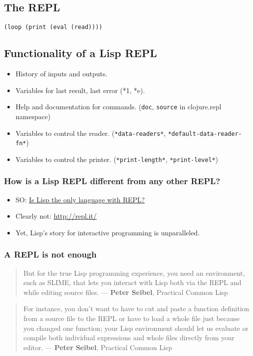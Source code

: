 \documentclass[11pt]{article}
\begin{document}
\subsection*{The REPL}
\label{sec:orgheadline12}
\begin{verbatim}
(loop (print (eval (read))))
\end{verbatim}
\subsection*{Functionality of a Lisp REPL}
\label{sec:orgheadline15}
\begin{itemize}
\item History of inputs and outputs.
\item Variables for last result, last error (*1, *e).
\item Help and documentation for commands. (\texttt{doc}, \texttt{source} in clojure.repl namespace)
\item Variables to control the reader. (\texttt{*data-readers*}, \texttt{*default-data-reader-fn*})
\item Variables to control the printer. (\texttt{*print-length*}, \texttt{*print-level*})
\end{itemize}
\subsubsection*{How is a Lisp REPL different from any other REPL?}
\label{sec:orgheadline13}

\begin{itemize}
\item SO: \href{http://stackoverflow.com/questions/5671214/is-lisp-the-only-language-with-repl}{Is Lisp the only language with REPL?}
\item Clearly not: \url{http://repl.it/}
\item Yet, Lisp’s story for interactive programming is unparalleled.
\end{itemize}

\subsubsection*{A REPL is not enough}
\label{sec:orgheadline14}
\begin{quote}
But for the true Lisp programming experience, you need an environment, such as SLIME, that lets you interact with Lisp both via the REPL and while editing source files. — \textbf{Peter Seibel}, Practical Common Lisp
\end{quote}
\begin{quote}
For instance, you don't want to have to cut and paste a function definition from a source file to the REPL or have to load a whole file just because you changed one function; your Lisp environment should let us evaluate or compile both individual expressions and whole files directly from your editor. — \textbf{Peter Seibel}, Practical Common Lisp
\end{quote}
\end{document}
